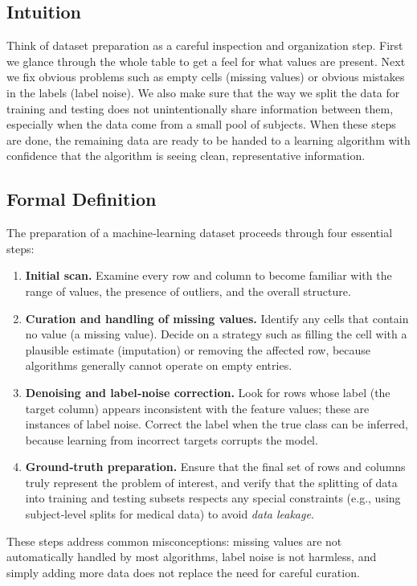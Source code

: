 \documentclass[12pt, a4paper]{article}
\begin{document}
\subsection{Intuition}
Think of dataset preparation as a careful inspection and organization step.  
First we glance through the whole table to get a feel for what values are present.  
Next we fix obvious problems such as empty cells (missing values) or obvious mistakes in the labels (label noise).  
We also make sure that the way we split the data for training and testing does not unintentionally share information between them, especially when the data come from a small pool of subjects.  
When these steps are done, the remaining data are ready to be handed to a learning algorithm with confidence that the algorithm is seeing clean, representative information.  

\subsection{Formal Definition}
The preparation of a machine‑learning dataset proceeds through four essential steps:

\begin{enumerate}
\item \textbf{Initial scan.} Examine every row and column to become familiar with the range of values, the presence of outliers, and the overall structure.
\item \textbf{Curation and handling of missing values.} Identify any cells that contain no value (a missing value). Decide on a strategy such as filling the cell with a plausible estimate (imputation) or removing the affected row, because algorithms generally cannot operate on empty entries.
\item \textbf{Denoising and label‑noise correction.} Look for rows whose label (the target column) appears inconsistent with the feature values; these are instances of label noise. Correct the label when the true class can be inferred, because learning from incorrect targets corrupts the model.
\item \textbf{Ground‑truth preparation.} Ensure that the final set of rows and columns truly represent the problem of interest, and verify that the splitting of data into training and testing subsets respects any special constraints (e.g., using subject‑level splits for medical data) to avoid \textit{data leakage}.
\end{enumerate}

These steps address common misconceptions: missing values are not automatically handled by most algorithms, label noise is not harmless, and simply adding more data does not replace the need for careful curation.  
\end{document}
